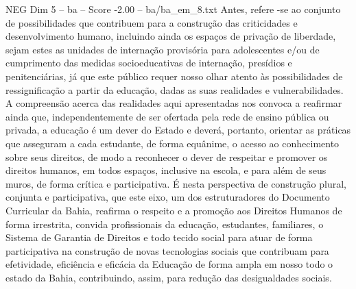 \begin{textsample}{NEG Dim 5 – ba – Score -2.00 – ba/ba\_em\_8.txt}
Antes, refere -se ao conjunto de possibilidades que contribuem para a construção das criticidades e desenvolvimento humano, incluindo ainda os espaços de privação de liberdade, sejam estes as unidades de internação provisória para adolescentes e/ou de cumprimento das medidas socioeducativas de internação, presídios e penitenciárias, já que este público requer nosso olhar atento às possibilidades de ressignificação a partir da educação, dadas as suas realidades e vulnerabilidades.
A compreensão acerca das realidades aqui apresentadas nos convoca a reafirmar ainda que, independentemente de ser ofertada pela rede de ensino pública ou privada, a educação é um dever do Estado e deverá, portanto, orientar as práticas que asseguram a cada estudante, de forma equânime, o acesso ao conhecimento sobre seus direitos, de modo a reconhecer o dever de respeitar e promover os direitos humanos, em todos espaços, inclusive na escola, e para além de seus muros, de forma crítica e participativa.
É nesta perspectiva de construção plural, conjunta e participativa, que este eixo, um dos estruturadores do Documento Curricular da Bahia, reafirma o respeito e a promoção aos Direitos Humanos de forma irrestrita, convida profissionais da educação, estudantes, familiares, o Sistema de Garantia de Direitos e todo tecido social para atuar de forma participativa na construção de novas tecnologias sociais que contribuam para efetividade, eficiência e eficácia da Educação de forma ampla em nosso todo o estado da Bahia, contribuindo, assim, para redução das desigualdades sociais.

\end{textsample}
